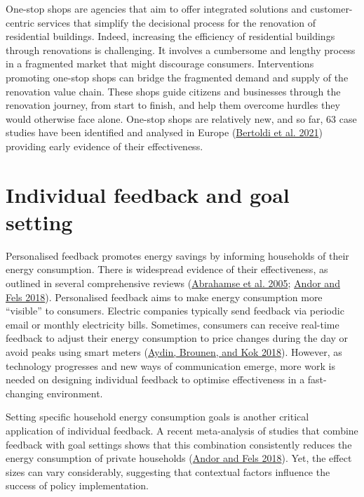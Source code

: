 \documentclass[
  12pt,
  captions=heading]{scrreport}
\begin{document}
One-stop shops are agencies that aim to offer integrated solutions and
customer-centric services that simplify the decisional process for the
renovation of residential buildings. Indeed, increasing the efficiency
of residential buildings through renovations is challenging. It involves
a cumbersome and lengthy process in a fragmented market that might
discourage consumers. Interventions promoting one-stop shops can bridge
the fragmented demand and supply of the renovation value chain. These
shops guide citizens and businesses through the renovation journey, from
start to finish, and help them overcome hurdles they would otherwise
face alone. One-stop shops are relatively new, and so far, 63 case
studies have been identified and analysed in Europe
(\protect\hyperlink{ref-bertoldi2021role}{Bertoldi et al. 2021})
providing early evidence of their effectiveness.

\hypertarget{individual-feedback-and-goal-setting}{%
\section{Individual feedback and goal
setting}\label{individual-feedback-and-goal-setting}}

Personalised feedback promotes energy savings by informing households of
their energy consumption. There is widespread evidence of their
effectiveness, as outlined in several comprehensive reviews
(\protect\hyperlink{ref-abrahamse2005review}{Abrahamse et al. 2005};
\protect\hyperlink{ref-andor2018behavioral}{Andor and Fels 2018}).
Personalised feedback aims to make energy consumption more ``visible''
to consumers. Electric companies typically send feedback via periodic
email or monthly electricity bills. Sometimes, consumers can receive
real-time feedback to adjust their energy consumption to price changes
during the day or avoid peaks using smart meters
(\protect\hyperlink{ref-aydin2018information}{Aydin, Brounen, and Kok
2018}). However, as technology progresses and new ways of communication
emerge, more work is needed on designing individual feedback to optimise
effectiveness in a fast-changing environment.

Setting specific household energy consumption goals is another critical
application of individual feedback. A recent meta-analysis of studies
that combine feedback with goal settings shows that this combination
consistently reduces the energy consumption of private households
(\protect\hyperlink{ref-andor2018behavioral}{Andor and Fels 2018}). Yet,
the effect sizes can vary considerably, suggesting that contextual
factors influence the success of policy implementation.
\end{document}
